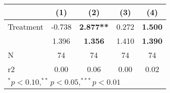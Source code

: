 \begin{tabular}{lcccc}
\hline\hline
                    &         (1)   &         (2)   &         (3)   &         (4)    \\
\hline
Treatment           &     -0.738  &     \textbf{2.877**}  &     0.272  &     \textbf{1.500}  \\
                    &     1.396        &     \textbf{1.356}        &     1.410        &     \textbf{1.390}        \\
\hline
N                   &      74        &     74                  &     74         &      74                 \\
r2                  &      0.00       &     0.06                 &     0.00        &      0.02                \\
\hline
\multicolumn{5}{l}{$^{*}p<0.10, ^{**}p<0.05, ^{***}p<0.01$} \\
\end{tabular}
